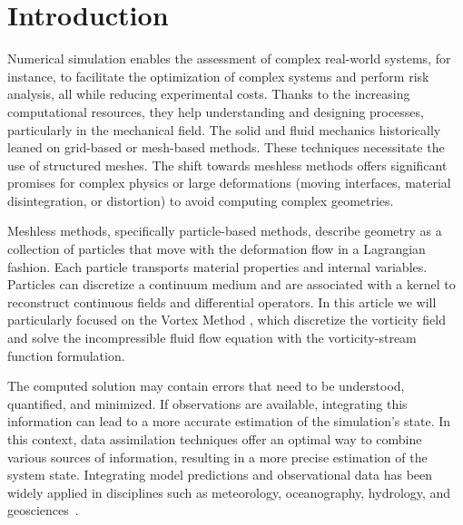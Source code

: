 
\section{Introduction}

Numerical simulation enables the assessment of complex real-world systems, for instance, to facilitate the optimization of complex systems and perform risk analysis, all while reducing experimental costs. Thanks to the increasing computational resources, they help understanding and designing processes, particularly in the mechanical field.
The solid and fluid mechanics historically leaned on grid-based or mesh-based methods. These techniques necessitate the use of structured meshes. The shift towards meshless methods offers significant promises for complex physics or large deformations (moving interfaces, material disintegration, or distortion) to avoid computing complex geometries.

Meshless methods, specifically particle-based methods, describe geometry as a collection of particles that move with the deformation flow in a Lagrangian fashion. Each particle transports material properties and internal variables. Particles can discretize a continuum medium and are associated with a kernel to reconstruct continuous fields and differential operators. In this article we will particularly focused on the Vortex Method \cite{cottet_vortex_2000,mimeau_review_2021}, which discretize the vorticity field and solve the incompressible fluid flow equation with the vorticity-stream function formulation.
\newline

The computed solution may contain errors that need to be understood, quantified, and minimized. If observations are available, integrating this information can lead to a more accurate estimation of the simulation's state. In this context, data assimilation techniques offer an optimal way to combine various sources of information, resulting in a more precise estimation of the system state. Integrating model predictions and observational data has been widely applied in disciplines such as meteorology, oceanography, hydrology, and geosciences~\cite{bocquet_introduction_2014}.

